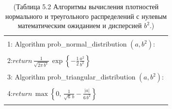 \documentclass[10pt,a4paper]{article}
\begin{document}
\begin{table}[H]
\begin{center}
\begin{tabular}{|l|}
\hline
{}\\
1: \hspace{3mm} Algorithm prob\_normal\_distribution $(a,b^2):$ \\
{}\\
2:\hspace{7mm}$\textit{return}\,\frac{1}{\sqrt{2\pi \,b^2}}\,\exp\left\lbrace -\frac{1}{2}\frac{a^2}{b^2}\right\rbrace$\\
{}\\
3:\hspace{3mm} Algorithm prob\_triangular\_distribution $(a,b^2):$ \\
{}\\
4:\hspace{7mm}$\textit{return}\,\max\left\lbrace 0,\,\frac{1}{\sqrt{6}\,b}-\frac{|a|}{6\,b^2}\right\rbrace$\\ 
{}\\
\hline
\end{tabular}
\caption{(Таблица 5.2 Алгоритмы вычисления плотностей нормального и треугольного распределений с нулевым математическим ожиданием и дисперсией $b^2$.)}
\end{center}
\end{table}
\end{document}
